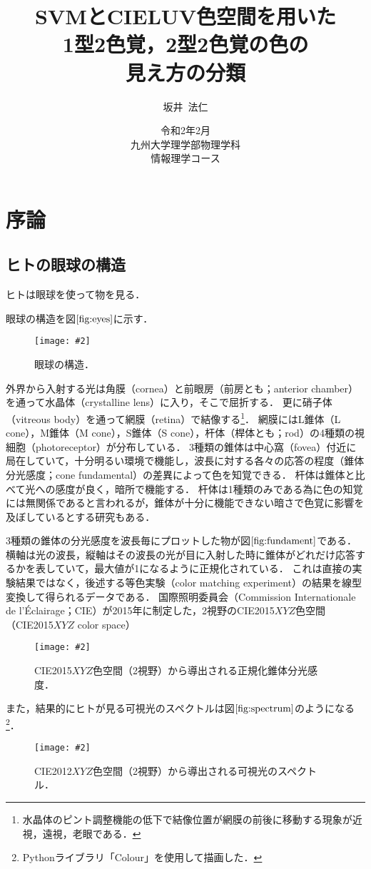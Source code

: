 \documentclass[uplatex,paper=a4,fontsize=4.0truemm,jafontsize=4.0truemm,head_space=30.0truemm,foot_space=30.0truemm,baselineskip=8.0truemm,line_length=40zw,gutter=25.0truemm,oneside,openany,fleqn,hanging_panctuation,open_bracket_pos=nibu_tentsuki,dvipdfmx,jis2004,book,titlepage]{jlreq}
\title{\vspace{-25truemm}\Huge{SVMとCIELUV色空間を用いた\\1型2色覚，2型2色覚の色の\\見え方の分類}\vspace{55truemm}}
\author{\huge{坂井~法仁}}
\date{\LARGE{令和2年2月}\\ \vspace{30truemm}\LARGE{九州大学理学部物理学科\\ 情報理学コース}}
\theoremstyle{mystyle}
\newcommand{\captiondot}[1]{\caption{#1．}}
\newcommand{\figureinput}[4]{\begin{figure}[tbp]\centering\texttt{[image: \#2]}\captiondot{#3}\label{fig:#4}\end{figure}}
\newcommand{\mathdisplaystyle}[1]{\(\displaystyle{#1}\)}
\newcommand{\Reference}[1]{\mathdisplaystyle{\ref{#1}}}
\begin{document}
	\maketitle
	\tableofcontents
	\clearpage
	\setcounter{page}{1}
	\chapter{序論}\label{chap:intro}
		\section{ヒトの眼球の構造}
			ヒトは眼球を使って物を見る．

			眼球の構造を図\Reference{fig:eyes}に示す．
			\figureinput{width=9.5truecm}{D:/a/figs/eye2.png}{眼球の構造\protect\cite[図-1]{Sotoyama1985}}{eyes}
			外界から入射する光は角膜（cornea）と前眼房（前房とも；anterior chamber）を通って水晶体（crystalline lens）に入り，そこで屈折する．
			更に硝子体（vitreous body）を通って網膜（retina）で結像する\footnote{水晶体のピント調整機能の低下で結像位置が網膜の前後に移動する現象が近視，遠視，老眼である．}．
			網膜にはL錐体（L cone），M錐体（M cone），S錐体（S cone），杆体（桿体とも；rod）の4種類の視細胞（photoreceptor）が分布している．
			3種類の錐体は中心窩（fovea）付近に局在していて，十分明るい環境で機能し，波長に対する各々の応答の程度（錐体分光感度；cone fundamental）の差異によって色を知覚できる．
			杆体は錐体と比べて光への感度が良く，暗所で機能する\cite{Hosoki2014}．
			杆体は1種類のみである為に色の知覚には無関係であると言われるが，錐体が十分に機能できない暗さで色覚に影響を及ぼしているとする研究もある\cite{Takeshita2014}．

			3種類の錐体の分光感度を波長毎にプロットした物が図\Reference{fig:fundament}である．
			横軸は光の波長，縦軸はその波長の光が目に入射した時に錐体がどれだけ応答するかを表していて，最大値が1になるように正規化されている．
			これは直接の実験結果ではなく，後述する等色実験（color matching experiment）の結果を線型変換して得られるデータである．
			国際照明委員会（Commission Internationale de l'Éclairage；CIE）が2015年に制定した，2\textdegree 視野のCIE2015\mathdisplaystyle{XYZ}色空間（CIE2015\mathdisplaystyle{XYZ} color space）
			\figureinput{width=\linewidth}{D:/a/figs/ConeFundamental.png}{CIE2015\mathdisplaystyle{XYZ}色空間（2\textdegree 視野）から導出される正規化錐体分光感度}{fundament}
			また，結果的にヒトが見る可視光のスペクトルは図\Reference{fig:spectrum}のようになる\footnote{Pythonライブラリ「Colour」を使用して描画した．}．
			\figureinput{width=10truecm}{D:/a/figs/spectrum.png}{CIE2012\mathdisplaystyle{XYZ}色空間（2\textdegree 視野）から導出される可視光のスペクトル}{spectrum}
\end{document}
